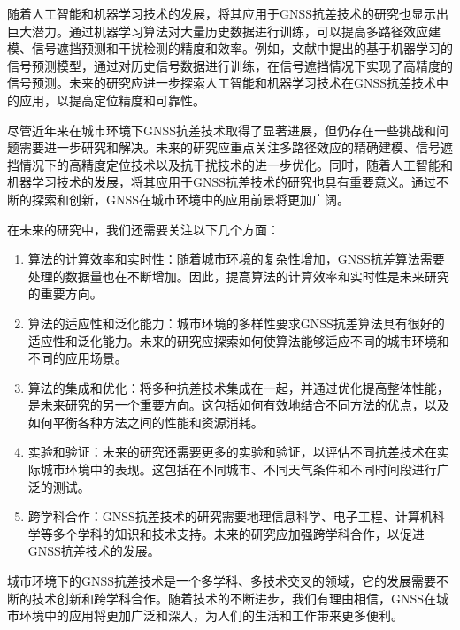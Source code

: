 \documentclass[12pt,hyperref,a4paper,UTF8]{ctexart}
\begin{document}
随着人工智能和机器学习技术的发展，将其应用于GNSS抗差技术的研究也显示出巨大潜力。通过机器学习算法对大量历史数据进行训练，可以提高多路径效应建模、信号遮挡预测和干扰检测的精度和效率。例如，文献中提出的基于机器学习的信号预测模型，通过对历史信号数据进行训练，在信号遮挡情况下实现了高精度的信号预测。未来的研究应进一步探索人工智能和机器学习技术在GNSS抗差技术中的应用，以提高定位精度和可靠性。

尽管近年来在城市环境下GNSS抗差技术取得了显著进展，但仍存在一些挑战和问题需要进一步研究和解决。未来的研究应重点关注多路径效应的精确建模、信号遮挡情况下的高精度定位技术以及抗干扰技术的进一步优化。同时，随着人工智能和机器学习技术的发展，将其应用于GNSS抗差技术的研究也具有重要意义。通过不断的探索和创新，GNSS在城市环境中的应用前景将更加广阔。

在未来的研究中，我们还需要关注以下几个方面：

\begin{enumerate}
    \item 算法的计算效率和实时性：随着城市环境的复杂性增加，GNSS抗差算法需要处理的数据量也在不断增加。因此，提高算法的计算效率和实时性是未来研究的重要方向。
    \item 算法的适应性和泛化能力：城市环境的多样性要求GNSS抗差算法具有很好的适应性和泛化能力。未来的研究应探索如何使算法能够适应不同的城市环境和不同的应用场景。
    \item 算法的集成和优化：将多种抗差技术集成在一起，并通过优化提高整体性能，是未来研究的另一个重要方向。这包括如何有效地结合不同方法的优点，以及如何平衡各种方法之间的性能和资源消耗。
    \item 实验和验证：未来的研究还需要更多的实验和验证，以评估不同抗差技术在实际城市环境中的表现。这包括在不同城市、不同天气条件和不同时间段进行广泛的测试。
    \item 跨学科合作：GNSS抗差技术的研究需要地理信息科学、电子工程、计算机科学等多个学科的知识和技术支持。未来的研究应加强跨学科合作，以促进GNSS抗差技术的发展。
\end{enumerate}

城市环境下的GNSS抗差技术是一个多学科、多技术交叉的领域，它的发展需要不断的技术创新和跨学科合作。随着技术的不断进步，我们有理由相信，GNSS在城市环境中的应用将更加广泛和深入，为人们的生活和工作带来更多便利。
\newpage


\end{document}
